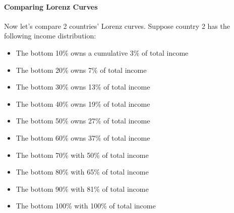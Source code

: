 \documentclass[letterpaper,10pt,english]{jupyterBook}
\begin{document}
\paragraph{Comparing Lorenz Curves}
\label{\detokenize{content/06-inequality/inequality:comparing-lorenz-curves}}
\sphinxAtStartPar
Now let’s compare 2 countries’ Lorenz curves. Suppose country 2 has the following income distribution:
\begin{itemize}
\item {} 
\sphinxAtStartPar
The bottom 10\% owns a cumulative 3\% of total income

\item {} 
\sphinxAtStartPar
The bottom 20\% owns 7\% of total income

\item {} 
\sphinxAtStartPar
The bottom 30\% owns 13\% of total income

\item {} 
\sphinxAtStartPar
The bottom 40\% owns 19\% of total income

\item {} 
\sphinxAtStartPar
The bottom 50\% owns 27\% of total income

\item {} 
\sphinxAtStartPar
The bottom 60\% owns 37\% of total income

\item {} 
\sphinxAtStartPar
The bottom 70\% with 50\% of total income

\item {} 
\sphinxAtStartPar
The bottom 80\% with 65\% of total income

\item {} 
\sphinxAtStartPar
The bottom 90\% with 81\% of total income

\item {} 
\sphinxAtStartPar
The bottom 100\% with 100\% of total income

\end{itemize}
\end{document}
